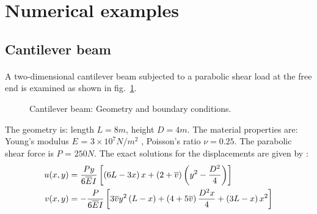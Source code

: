 \section{Numerical examples}

\subsection{Cantilever beam}
\paragraph{}
A two-dimensional cantilever beam subjected to a parabolic shear load at the free end is examined as shown
in fig.~\ref{fig:cantilever_beam_geo_bc}.
    \begin{figure}[h!]
    \centering
        \caption{ Cantilever beam: Geometry and boundary conditions.}
        \label{fig:cantilever_beam_geo_bc}
    \end{figure}

The geometry is: length $L=8m$, height $D=4m$.
The material properties are: Young’s modulus $E$ = $3 \times 10^7 N/m^2$ , Poisson’s ratio $ν=0.25$.
The parabolic shear force is $P$ = $250 N$.
The exact solutions for the displacements are given by \cite{Aug2008}:
    \begin{equation}
        \begin{aligned}
            u(x,y) &= 
                \frac{Py}{6 \overline{E} I}
                \left[
                    \left(
                        6L-3x
                    \right)x
                    +\left(
                        2+ \overline{v}
                    \right)\left(
                        y^2-\frac{D^2}{4}
                    \right)
                \right]
            \\
            v(x,y) &=  
                -\frac{P}{6 \overline{E} I}
                \left[
                    3 \overline{v} y^2 \left(
                        L-x
                    \right)+
                    \left(
                        4+5 \overline{v}
                    \right)\frac{D^2x}{4}+
                    \left(
                        3L-x
                    \right)x^2
                \right]        
        \end{aligned}
    \label{eq:cantilever_beam_displacement_solution}
    \end{equation}

